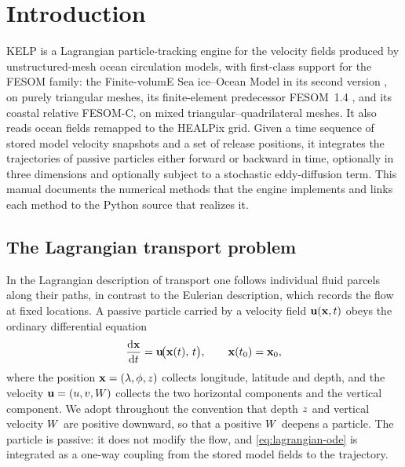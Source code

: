 \chapter{Introduction}\label{ch:intro}

\textsf{KELP} is a Lagrangian particle-tracking engine for the velocity
fields produced by unstructured-mesh ocean circulation models, with first-class
support for the FESOM family: the Finite-volumE Sea ice--Ocean Model in its second
version \citep[FESOM2;][]{danilov2017fesom2}, on purely triangular meshes, its finite-element
predecessor FESOM~1.4 \citep{wang2014fesom14}, and its coastal relative FESOM-C, on mixed
triangular--quadrilateral meshes. It also reads ocean fields
remapped to the HEALPix grid. Given a time sequence of stored model
velocity snapshots and a set of release positions, it integrates the trajectories
of passive particles either forward or backward in time, optionally in three
dimensions and optionally subject to a stochastic eddy-diffusion term. This manual
documents the numerical methods that the engine implements and links each method
to the Python source that realizes it.

\section{The Lagrangian transport problem}\label{sec:intro-lagrangian}

In the Lagrangian description of transport one follows individual fluid parcels
along their paths, in contrast to the Eulerian description, which records the flow
at fixed locations. A passive particle carried by a velocity field
$\mathbf{u}(\mathbf{x},t)$ obeys the ordinary differential equation
\begin{equation}\label{eq:lagrangian-ode}
  \frac{\mathrm{d} \mathbf{x}}{\mathrm{d} t} = \mathbf{u}\!\bigl(\mathbf{x}(t),\,t\bigr),
  \qquad \mathbf{x}(t_0)=\mathbf{x}_0 ,
\end{equation}
where the position $\mathbf{x}=(\lambda,\phi,z)$ collects longitude, latitude and
depth, and the velocity $\mathbf{u}=(u,v,W)$ collects the two horizontal
components and the vertical component. We adopt throughout the convention that
depth $z$ and vertical velocity $W$ are positive downward, so that a
positive $W$ deepens a particle. The particle is passive: it does not modify
the flow, and \cref{eq:lagrangian-ode} is integrated as a one-way coupling from
the stored model fields to the trajectory.

